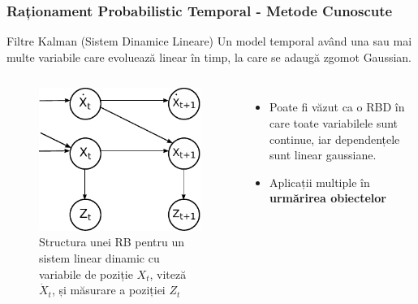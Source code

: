 \begin{frame}[t]
    \frametitle{Raționament Probabilistic Temporal - Metode Cunoscute}
  
  \begin{block}{Filtre Kalman (Sistem Dinamice Lineare)}
	Un model temporal având una sau mai multe variabile care evoluează linear în timp, la care se adaugă 
	\alert{zgomot Gaussian}.
  \end{block}
  
  \begin{columns}[T]
  	\begin{figure}
  		\centering
  		\includegraphics[height=0.35\textheight]{graphics/hmm-intro/kalman/kalman_filter_simple.pdf}
  		\caption{\tiny{Structura unei RB pentru un sistem linear dinamic cu variabile de poziție $X_t$, 
  		viteză $\dot{X}_t$, și măsurare a poziției $Z_t$}}
  	\end{figure}
	  
  	\begin{itemize}
  		\item \footnotesize{Poate fi văzut ca o RBD în care toate variabilele sunt continue, iar dependențele sunt 
  		linear gaussiane.}
  		\item \footnotesize{Aplicații multiple în \textbf{urmărirea obiectelor}}
  	\end{itemize}
  \end{columns}
  
\end{frame}

